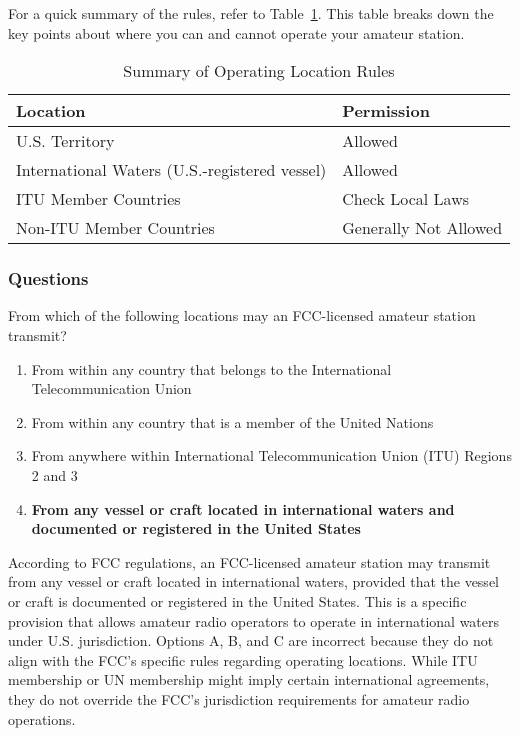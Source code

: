 For a quick summary of the rules, refer to Table~\ref{tab:operating-location-summary}. This table breaks down the key points about where you can and cannot operate your amateur station.

\begin{table}[h]
    \centering
    \begin{tabular}{|l|l|}
        \hline
        \textbf{Location} & \textbf{Permission} \\
        \hline
        U.S. Territory & Allowed \\
        International Waters (U.S.-registered vessel) & Allowed \\
        ITU Member Countries & Check Local Laws \\
        Non-ITU Member Countries & Generally Not Allowed \\
        \hline
    \end{tabular}
    \caption{Summary of Operating Location Rules}
    \label{tab:operating-location-summary}
\end{table}

\subsubsection{Questions}

\begin{tcolorbox}[colback=gray!10!white,colframe=black!75!black,title={T1C06}]
    From which of the following locations may an FCC-licensed amateur station transmit?
    \begin{enumerate}[label=\Alph*),noitemsep]
        \item From within any country that belongs to the International Telecommunication Union
        \item From within any country that is a member of the United Nations
        \item From anywhere within International Telecommunication Union (ITU) Regions 2 and 3
        \item \textbf{From any vessel or craft located in international waters and documented or registered in the United States}
    \end{enumerate}
\end{tcolorbox}

 According to FCC regulations, an FCC-licensed amateur station may transmit from any vessel or craft located in international waters, provided that the vessel or craft is documented or registered in the United States. This is a specific provision that allows amateur radio operators to operate in international waters under U.S. jurisdiction. Options A, B, and C are incorrect because they do not align with the FCC's specific rules regarding operating locations. While ITU membership or UN membership might imply certain international agreements, they do not override the FCC's jurisdiction requirements for amateur radio operations.
